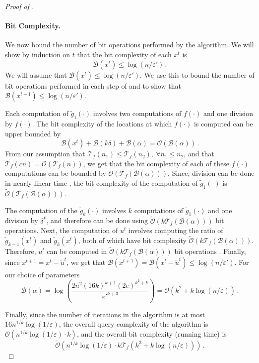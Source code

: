 \documentclass{article}[12pt]
\theoremstyle{definition}
\renewcommand{\leq}{\leqslant}
\newcommand{\mper}{\,.}
\newcommand{\paren}[1]{\left(#1 \right )}
\newcommand{\e}{\epsilon}
\let\e\varepsilon
\newcommand{\cB}{\mathcal B}
\newcommand{\cT}{\mathcal T}
\newcommand{\bigO}{\mathcal{O}}
\newcommand{\bigo}[1]{\bigO\left(#1\right)}
\newcommand{\tbigO}{\tilde{\mathcal{O}}}
\newcommand{\tbigo}[1]{\tbigO\left(#1\right)}
\newcommand{\charp}{f}
\newcommand{\tg}{\tilde{g}}
\newcommand{\tut}{\tilde{u}^t}
\newcommand{\eprime}{\e'}
\newcommand{\ftime}[1]{\cT_{\charp}\paren{#1}}
\newcommand{\bitcomp}[1]{\cB\paren{#1}}
\begin{document}
\begin{proof}[Proof of ]
\paragraph{Bit Complexity.}
We now bound the number of bit operations performed by the algorithm. 
We will show by induction on $t$ that the bit complexity of each $x^t$ is 
\begin{equation}
\label{eq:bitcompxt}
\bitcomp{x^t} \leq \log (n/\eprime) \mper
\end{equation}
We will assume that $\bitcomp{x^t} \leq \log (n/\eprime)$. We use this to
bound the number of bit operations performed in each step of  
and to show that $\bitcomp{x^{t+1}} \leq \log (n/\eprime)$.


Each computation of $\tg_1(\cdot)$ involves two computations of $\charp(\cdot)$
and one division by $\charp(\cdot)$. The bit complexity of the locations at which 
$\charp(\cdot)$ is computed can be upper bounded by 
\[ \bitcomp{x^t} + \bitcomp{k \delta} + \bitcomp{\alpha} = \bigo{\bitcomp{\alpha}}  \mper    \]
From our assumption that $\ftime{n_1} \leq \ftime{n_2},\ \forall n_1 \leq n_2$, 
and that $\ftime{cn} = \bigo{\ftime{n}}$, 
we get that 
the bit complexity of each of these $\charp(\cdot)$ computations can be bounded by
$\bigo{\ftime{\bitcomp{\alpha}}}$.
Since, division can be done in nearly linear time \cite{ss71},
the bit complexity of the computation of $\tg_1(\cdot)$ is 
$\tbigo{\ftime{\bitcomp{\alpha}}}$.

The computation of the $\tg_k(\cdot)$ involves $k$ computations of $\tg_1(\cdot)$ and
one division by $\delta^k$,
and therefore can be done using $\tbigo{k \ftime{\bitcomp{\alpha}}}$ bit operations.
Next, the computation of $u^t$ involves computing the ratio of $\tg_{k-1}(x^t)$ and $\tg_k(x^t)$,  
both of which have bit complexity $\tbigo{k \ftime{\bitcomp{\alpha}}}$. 
Therefore, $u^t$ can be computed in $\tbigo{k \ftime{\bitcomp{\alpha}}}$
bit operations \cite{ss71}.
Finally, since $x^{t+1} = x^t - \tut$, we get that 
$\bitcomp{x^{t+1}} =  \bitcomp{x^t - \tut} \leq \log (n/\eprime)$.
For our choice of parameters
\[ \bitcomp{\alpha} = \log \paren{\frac{2n^2 (16k)^{k+1} (2e)^{k^2+k}}{\eprime^{k+3}} } 
 = \bigo{k^2 + k\log (n/\e)} \mper \]

Finally, since the number of iterations in the algorithm is at most $16 n^{1/k}  \log \paren{1/\e }$,
the overall query complexity of the algorithm is $\bigo{ n^{1/k}  \log \paren{1/\e } \cdot k}$, 
and the overall bit complexity (running time) is 
\[\tbigo{  n^{1/k} \log \paren{1/\e }\cdot k \ftime{ k^2 +k \log (n/\e) }} \mper  \]
\end{proof}
\end{document}
